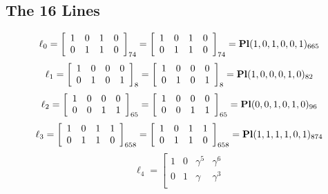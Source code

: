\documentclass{article}
\begin{document}
{\subsection*{The 16 Lines}
$$
\ell_{0} = 
\left[
\begin{array}{*{4}{r}}
1 & 0 & 1 & 0\\
0 & 1 & 1 & 0\\
\end{array}
\right]
_{74}
=
\left[
\begin{array}{*{4}c}
1  & 0  & 1  & 0\\
0  & 1  & 1  & 0\\
\end{array}
\right]_{74}
={\rm\bf Pl}(1,0,1,0,0,1 )_{665}$$
$$
\ell_{1} = 
\left[
\begin{array}{*{4}{r}}
1 & 0 & 0 & 0\\
0 & 1 & 0 & 1\\
\end{array}
\right]
_{8}
=
\left[
\begin{array}{*{4}c}
1  & 0  & 0  & 0\\
0  & 1  & 0  & 1\\
\end{array}
\right]_{8}
={\rm\bf Pl}(1,0,0,0,1,0 )_{82}$$
$$
\ell_{2} = 
\left[
\begin{array}{*{4}{r}}
1 & 0 & 0 & 0\\
0 & 0 & 1 & 1\\
\end{array}
\right]
_{65}
=
\left[
\begin{array}{*{4}c}
1  & 0  & 0  & 0\\
0  & 0  & 1  & 1\\
\end{array}
\right]_{65}
={\rm\bf Pl}(0,0,1,0,1,0 )_{96}$$
$$
\ell_{3} = 
\left[
\begin{array}{*{4}{r}}
1 & 0 & 1 & 1\\
0 & 1 & 1 & 0\\
\end{array}
\right]
_{658}
=
\left[
\begin{array}{*{4}c}
1  & 0  & 1  & 1\\
0  & 1  & 1  & 0\\
\end{array}
\right]_{658}
={\rm\bf Pl}(1,1,1,1,0,1 )_{874}$$
$$
\ell_{4} = 
\left[
\begin{array}{*{4}{r}}
1 & 0 & \gamma^{5} & \gamma^{6}\\
0 & 1 & \gamma  & \gamma^{3}\\

\end{array}$$}
\end{document}
